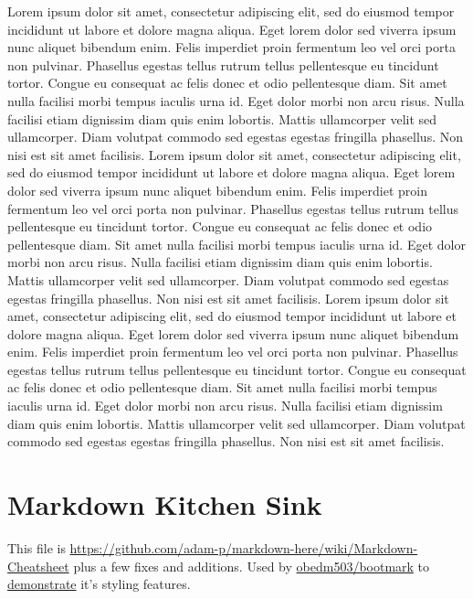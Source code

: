 \documentclass[
]{article}
\begin{document}
Lorem ipsum dolor sit amet, consectetur adipiscing elit, sed do eiusmod
tempor incididunt ut labore et dolore magna aliqua. Eget lorem dolor sed
viverra ipsum nunc aliquet bibendum enim. Felis imperdiet proin
fermentum leo vel orci porta non pulvinar. Phasellus egestas tellus
rutrum tellus pellentesque eu tincidunt tortor. Congue eu consequat ac
felis donec et odio pellentesque diam. Sit amet nulla facilisi morbi
tempus iaculis urna id. Eget dolor morbi non arcu risus. Nulla facilisi
etiam dignissim diam quis enim lobortis. Mattis ullamcorper velit sed
ullamcorper. Diam volutpat commodo sed egestas egestas fringilla
phasellus. Non nisi est sit amet facilisis. Lorem ipsum dolor sit amet,
consectetur adipiscing elit, sed do eiusmod tempor incididunt ut labore
et dolore magna aliqua. Eget lorem dolor sed viverra ipsum nunc aliquet
bibendum enim. Felis imperdiet proin fermentum leo vel orci porta non
pulvinar. Phasellus egestas tellus rutrum tellus pellentesque eu
tincidunt tortor. Congue eu consequat ac felis donec et odio
pellentesque diam. Sit amet nulla facilisi morbi tempus iaculis urna id.
Eget dolor morbi non arcu risus. Nulla facilisi etiam dignissim diam
quis enim lobortis. Mattis ullamcorper velit sed ullamcorper. Diam
volutpat commodo sed egestas egestas fringilla phasellus. Non nisi est
sit amet facilisis. Lorem ipsum dolor sit amet, consectetur adipiscing
elit, sed do eiusmod tempor incididunt ut labore et dolore magna aliqua.
Eget lorem dolor sed viverra ipsum nunc aliquet bibendum enim. Felis
imperdiet proin fermentum leo vel orci porta non pulvinar. Phasellus
egestas tellus rutrum tellus pellentesque eu tincidunt tortor. Congue eu
consequat ac felis donec et odio pellentesque diam. Sit amet nulla
facilisi morbi tempus iaculis urna id. Eget dolor morbi non arcu risus.
Nulla facilisi etiam dignissim diam quis enim lobortis. Mattis
ullamcorper velit sed ullamcorper. Diam volutpat commodo sed egestas
egestas fringilla phasellus. Non nisi est sit amet facilisis.

\section{Markdown Kitchen Sink}\label{markdown-kitchen-sink}

This file is
\url{https://github.com/adam-p/markdown-here/wiki/Markdown-Cheatsheet}
plus a few fixes and additions. Used by
\href{https://github.com/obedm503/bootmark}{obedm503/bootmark} to
\href{https://obedm503.github.io/bootmark/docs/markdown-cheatsheet.html}{demonstrate}
it's styling features.
\end{document}
